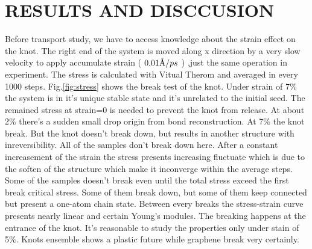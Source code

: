\documentclass[%
 reprint,
 amsmath,amssymb,
 aps,
prb,
]{revtex4-1}
\newcommand{\angstrom}{\mbox{\normalfont\AA}}
\begin{document}
\section{RESULTS AND DISCCUSION}


Before transport study, we have to access knowledge about the strain effect on the knot. The right end of the system is moved along x direction by a very slow velocity to apply accumulate strain ( $0.01 \angstrom / ps$ ) ,just the same operation in experiment. The stress is calculated with Vitual Therom and averaged in every 1000 steps. Fig.\ref{fig:stress} shows the break test of the knot. Under strain of 7\% the system is in it's unique stable state and it's unrelated to the initial seed. The remained stress at strain=0 is needed to prevent  the knot from release. At about 2\% there's a sudden small drop origin from bond reconstruction. At 7\% the knot break. But the knot doesn't break down, but results in another structure with inreversibility. All of the samples don't break down here. After a constant increasement of the strain the stress presents increasing fluctuate which is due to the soften of the structure which make it inconverge within the average steps. Some of the samples doesn't break even until the total stress exceed the first break critical stress. Some of them break down, but some of them keep connected but present a one-atom chain state. Between every breaks the stress-strain curve presents nearly linear and certain Young's modules.
The breaking happens at the entrance of the knot.
It's reasonable to study the properties only under stain of 5\%.
Knots ensemble shows a plastic future while graphene break very certainly.
\end{document}
